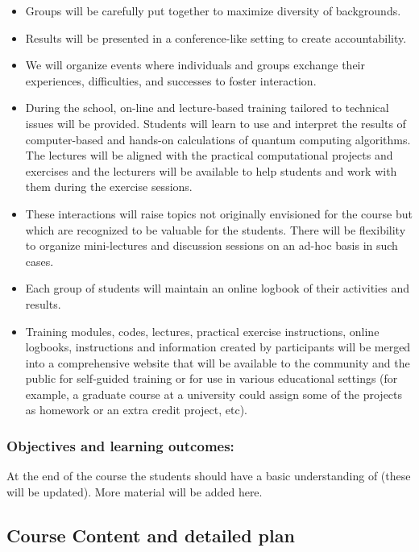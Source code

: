 \documentclass[twocolumn,superscriptaddress,amsmath,amssymb,aps,floatfix]{revtex4-2}
\begin{document}
\begin{itemize}
\item
  Groups will be carefully put together to maximize diversity of
  backgrounds.
\item
  Results will be presented in a conference-like setting to create
  accountability.
\item
  We will organize events where individuals and groups exchange their
  experiences, difficulties, and successes to foster interaction.
\item
  During the school, on-line and lecture-based training tailored to
  technical issues will be provided. Students will learn to use and
  interpret the results of computer-based and hands-on calculations of
  quantum computing algorithms. The lectures will be aligned with the
  practical computational projects and exercises and the lecturers will
  be available to help students and work with them during the exercise
  sessions.
\item
  These interactions will raise topics not originally envisioned for the
  course but which are recognized to be valuable for the students. There
  will be flexibility to organize mini-lectures and discussion sessions
  on an ad-hoc basis in such cases.
\item
  Each group of students will maintain an online logbook of their
  activities and results.
\item
  Training modules, codes, lectures, practical exercise instructions,
  online logbooks, instructions and information created by participants
  will be merged into a comprehensive website that will be available to
  the community and the public for self-guided training or for use in
  various educational settings (for example, a graduate course at a
  university could assign some of the projects as homework or an extra
  credit project, etc).
\end{itemize}

    \subsubsection{Objectives and learning
outcomes:}\label{objectives-and-learning-outcomes}

At the end of the course the students should have a basic understanding
of (these will be updated). More material will be added here.

    \subsection{Course Content and detailed plan}
\end{document}
